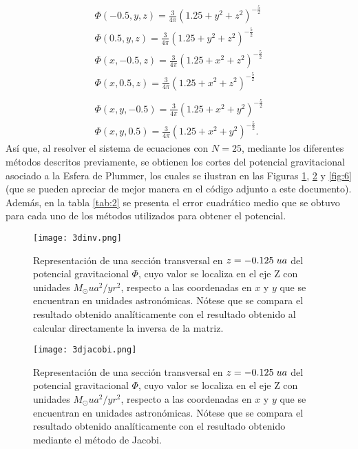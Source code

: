 \documentclass[reprint,amsmath,amssymb,aps]{revtex4-2}
\begin{document}
\begin{eqnarray}
    \varPhi(-0.5,y,z)= \frac{3}{4\pi} \left( 1.25+y^2+z^2 \right)^{-\frac{5}{2}}\\
    \varPhi(0.5,y,z)= \frac{3}{4\pi} \left( 1.25+y^2+z^2 \right)^{-\frac{5}{2}}\\
    \varPhi(x,-0.5,z)=\frac{3}{4\pi} \left( 1.25+x^2+z^2 \right)^{-\frac{5}{2}}\\
    \varPhi(x,0.5,z)=\frac{3}{4\pi} \left( 1.25+x^2+z^2 \right)^{-\frac{5}{2}}\\\\
    \varPhi(x,y,-0.5)=\frac{3}{4\pi} \left( 1.25+x^2+y^2 \right)^{-\frac{5}{2}}\\
    \varPhi(x,y,0.5)=\frac{3}{4\pi} \left( 1.25+x^2+y^2 \right)^{-\frac{5}{2}}.
\end{eqnarray}
Así que, al resolver el sistema de ecuaciones con $N=25$, mediante los diferentes métodos descritos previamente, se obtienen los cortes del potencial gravitacional asociado a la Esfera de Plummer, los cuales se ilustran en las Figuras \ref{fig:4}, \ref{fig:5} y \ref{fig:6} (que se pueden apreciar de mejor manera en el código adjunto a este documento). Además, en la tabla \ref{tab:2} se presenta el error cuadrático medio que se obtuvo para cada uno de los métodos utilizados para obtener el potencial. \\
\begin{figure}
    \centering
    \texttt{[image: 3dinv.png]}
    \caption{Representación de una sección transversal en $z=-0.125 \hspace{0.1 cm} ua$ del potencial gravitacional $\varPhi$, cuyo valor se localiza en el eje Z con unidades $M_{\odot} ua^2/yr^2$, respecto a las coordenadas en $x$ y $y$ que se encuentran en unidades astronómicas. Nótese que se compara el resultado obtenido analíticamente con el resultado obtenido al calcular directamente la inversa de la matriz.}
    \label{fig:4}
\end{figure}
\begin{figure}
    \centering
    \texttt{[image: 3djacobi.png]}
    \caption{Representación de una sección transversal en $z=-0.125 \hspace{0.1 cm} ua$ del potencial gravitacional $\varPhi$, cuyo valor se localiza en el eje Z con unidades $M_{\odot} ua^2/yr^2$, respecto a las coordenadas en $x$ y $y$ que se encuentran en unidades astronómicas. Nótese que se compara el resultado obtenido analíticamente con el resultado obtenido mediante el método de Jacobi.}
    \label{fig:5}
\end{figure}
\end{document}
